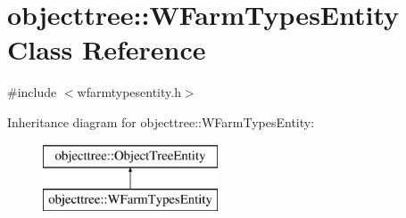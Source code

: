 \hypertarget{classobjecttree_1_1_w_farm_types_entity}{}\section{objecttree\+::W\+Farm\+Types\+Entity Class Reference}
\label{classobjecttree_1_1_w_farm_types_entity}


{\ttfamily \#include $<$wfarmtypesentity.\+h$>$}

Inheritance diagram for objecttree\+::W\+Farm\+Types\+Entity\+:\begin{figure}[H]
\begin{center}
\leavevmode
\includegraphics[height=2.000000cm]{d1/d68/classobjecttree_1_1_w_farm_types_entity}
\end{center}
\end{figure}
